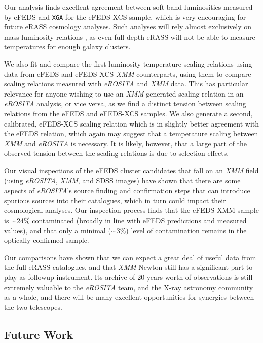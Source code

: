 \documentclass[fleqn,usenatbib]{mnras}
\begin{document}
Our analysis finds excellent agreement between soft-band luminosities measured by eFEDS and \texttt{XGA} for the eFEDS-XCS sample, which is very encouraging for future eRASS cosmology analyses. Such analyses will rely almost exclusively on mass-luminosity relations \citep[such as the eFEDS-HSC collaboration, ][]{efedsmor}, as even full depth eRASS will not be able to measure temperatures for enough galaxy clusters. 

We also fit and compare the first luminosity-temperature scaling relations using data from eFEDS and eFEDS-XCS {\em XMM} counterparts, using them to compare scaling relations measured with {\em eROSITA} and {\em XMM} data. This has particular relevance for anyone wishing to use an {\em XMM} generated scaling relation in an {\em eROSITA} analysis, or vice versa, as we find a distinct tension between scaling relations from the eFEDS and eFEDS-XCS samples. We also generate a second, calibrated, eFEDS-XCS scaling relation which is in slightly better agreement with the eFEDS relation, which again may suggest that a temperature scaling between {\em XMM} and {\em eROSITA} is necessary. It is likely, however, that a large part of the observed tension between the scaling relations is due to selection effects.

Our visual inspections of the eFEDS cluster candidates that fall on an {\em XMM} field (using {\em eROSITA}, {\em XMM}, and SDSS images) have shown that there are some aspects of {\em eROSITA}'s source finding and confirmation steps that can introduce spurious sources into their catalogues, which in turn could impact their cosmological analyses. Our inspection process finds that the eFEDS-XMM sample is ${\sim}$24\% contaminated (broadly in line with eFEDS predictions and measured values), and that only a minimal (${\sim}$3\%) level of contamination remains in the optically confirmed sample.

Our comparisons have shown that we can expect a great deal of useful data from the full eRASS catalogues, and that {\em XMM}-Newton still has a significant part to play as followup instrument. Its archive of 20 years worth of observations is still extremely valuable to the {\em eROSITA} team, and the X-ray astronomy community as a whole, and there will be many excellent opportunities for synergies between the two telescopes.

\subsection{Future Work}
\end{document}
